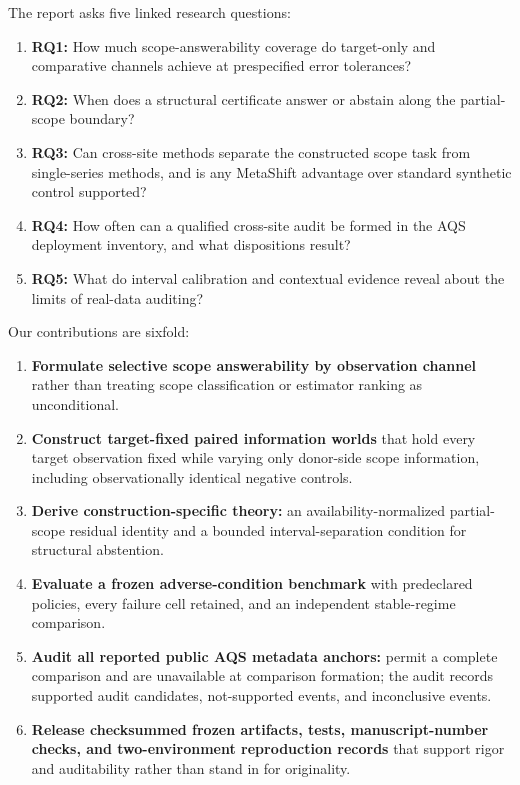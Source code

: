 The report asks five linked research questions:
\begin{enumerate}
  \item \textbf{RQ1:} How much scope-answerability coverage do target-only and
  comparative channels achieve at prespecified error tolerances?
  \item \textbf{RQ2:} When does a structural certificate answer or abstain
  along the partial-scope boundary?
  \item \textbf{RQ3:} Can cross-site methods separate the constructed scope
  task from single-series methods, and is any MetaShift advantage over standard
  synthetic control supported?
  \item \textbf{RQ4:} How often can a qualified cross-site audit be formed in
  the AQS deployment inventory, and what dispositions result?
  \item \textbf{RQ5:} What do interval calibration and contextual evidence
  reveal about the limits of real-data auditing?
\end{enumerate}

Our contributions are sixfold:
\begin{enumerate}[label=\textbf{C\arabic*.}]
  \item \textbf{Formulate selective scope answerability by observation channel}
  rather than treating scope classification or estimator ranking as
  unconditional.
  \item \textbf{Construct target-fixed paired information worlds} that hold
  every target observation fixed while varying only donor-side scope information, including
  observationally identical negative controls.
  \item \textbf{Derive construction-specific theory:} an
  availability-normalized partial-scope residual identity and a bounded
  interval-separation condition for structural abstention.
  \item \textbf{Evaluate a frozen adverse-condition benchmark} with
  predeclared policies, every failure cell retained, and an independent
  stable-regime comparison.
  \item \textbf{Audit all \TotalAnchors{} reported public AQS metadata anchors:}
  \CompleteComparisons{} permit a complete comparison and
  \UnavailableAtFormationAnchors{} are unavailable at comparison formation; the
  audit records \SupportedCandidates{} supported audit candidates,
  \NotSupportedEvents{} not-supported events, and \InconclusiveEvents{}
  inconclusive events.
  \item \textbf{Release checksummed frozen artifacts, tests, manuscript-number
  checks, and two-environment reproduction records} that support rigor and
  auditability rather than stand in for originality.
\end{enumerate}

